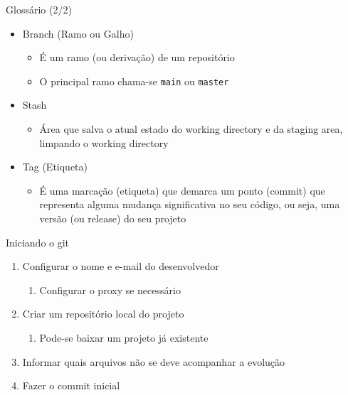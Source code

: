 \documentclass[14pt]{beamer}
\begin{document}
\begin{frame}{Glossário (2/2)}
    \begin{itemize}
        \item Branch (Ramo ou Galho)
        \begin{itemize}
            \item É um ramo (ou derivação) de um repositório
            \item O principal ramo chama-se \texttt{main} ou \texttt{master}
        \end{itemize}
        \item Stash
        \begin{itemize}
            \item Área que salva o atual estado do working directory e da
            staging area, limpando o working directory
        \end{itemize}
        \item Tag (Etiqueta)
        \begin{itemize}
            \item É uma marcação (etiqueta) que demarca um ponto (commit) que
            representa alguma mudança significativa no seu código, ou seja, uma
            versão (ou release) do seu projeto
        \end{itemize}        
    \end{itemize}
\end{frame}

\begin{frame}{Iniciando o git}
    \begin{enumerate}
        \item Configurar o nome e e-mail do desenvolvedor
        \begin{enumerate}
            \item Configurar o proxy se necessário
        \end{enumerate}
        \item Criar um repositório local do projeto
        \begin{enumerate}
            \item Pode-se baixar um projeto já existente
        \end{enumerate}
        \item Informar quais arquivos não se deve acompanhar a evolução
        \item Fazer o commit inicial
    \end{enumerate}
\end{frame}
\end{document}
